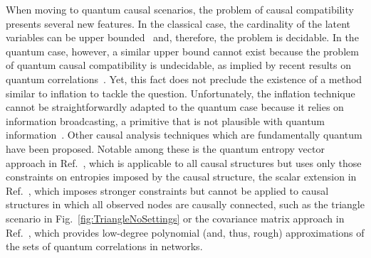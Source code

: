 \documentclass[superscriptaddress,aps,prx,nofootinbib,twocolumn,twoside,reprint,letterpaper,longbibliography]{revtex4-2}
\begin{document}
When moving to quantum causal scenarios, the problem of causal compatibility presents several new features.
In the classical case, the cardinality of the latent variables can be upper bounded~\cite{rosset2016finite} and, therefore, the problem is decidable.
In the quantum case, however, a similar upper bound cannot exist because the problem of quantum causal compatibility is undecidable, as implied by recent results on quantum correlations~\cite{Slofstra,Ji2020Connes}.
Yet, this fact does not preclude the existence of a method similar to inflation to tackle the question.
Unfortunately, the inflation technique cannot be straightforwardly adapted to the quantum case because it relies on information broadcasting, a primitive that is not plausible with quantum information~\cite{BroadcastingMixed,NoCloningGeneral2006}.
Other causal analysis techniques which are fundamentally quantum have been proposed.
Notable among these is the quantum entropy vector approach in Ref.~\cite{Chaves2015}, which is applicable to all causal structures but uses only those constraints on entropies imposed by the causal structure, the scalar extension in Ref.~\cite{Pozas2019}, which imposes stronger constraints but cannot be applied to causal structures in which all observed nodes are causally connected, such as the triangle scenario in Fig.~\ref{fig:TriangleNoSettings} or the covariance matrix approach in Ref.~\cite{aberg2020covariance}, which provides low-degree polynomial (and, thus, rough) approximations of the sets of quantum correlations in networks.
\end{document}
